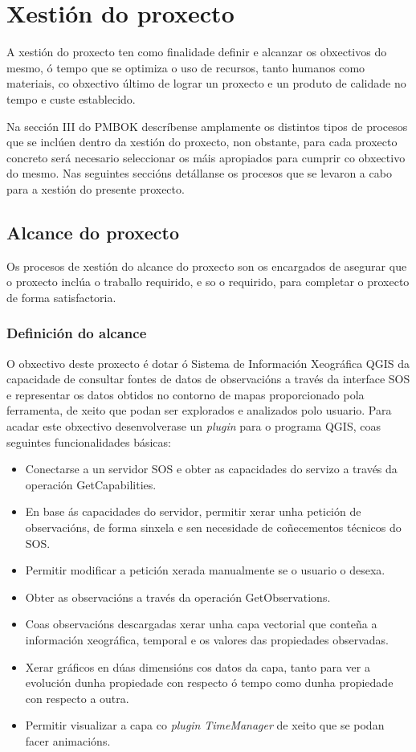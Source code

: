 \chapter{Xestión do proxecto}
A xestión do proxecto ten como finalidade definir e alcanzar os obxectivos do mesmo, ó tempo que se optimiza o uso de recursos, tanto humanos como materiais, co obxectivo último de lograr un proxecto e un produto de calidade no tempo e custe establecido.

Na sección III do PMBOK\cite{PMBOK} descríbense amplamente os distintos tipos de procesos que se inclúen dentro da xestión do proxecto, non obstante, para cada proxecto concreto será necesario seleccionar os máis apropiados para cumprir co obxectivo do mesmo. Nas seguintes seccións detállanse os procesos que se levaron a cabo para a xestión do presente proxecto.

\section{Alcance do proxecto}
Os procesos de xestión do alcance do proxecto son os encargados de asegurar que o proxecto inclúa o traballo requirido, e so o requirido, para completar o proxecto de forma satisfactoria.

\subsection{Definición do alcance}\label{subsec:DefAlcance}
O obxectivo deste proxecto é dotar ó Sistema de Información Xeográfica QGIS da capacidade de consultar fontes de datos de observacións a través da interface SOS e representar os datos obtidos no contorno de mapas proporcionado pola ferramenta, de xeito que podan ser explorados e analizados polo usuario. Para acadar este obxectivo desenvolverase un \emph{plugin} para o programa QGIS, coas seguintes funcionalidades básicas:

\begin{itemize}
\item Conectarse a un servidor SOS e obter as capacidades do servizo a través da operación GetCapabilities.
\item En base ás capacidades do servidor, permitir xerar unha petición de observacións, de forma sinxela e sen necesidade de coñecementos técnicos do SOS.
\item Permitir modificar a petición xerada manualmente se o usuario o desexa.
\item Obter as observacións a través da operación GetObservations.
\item Coas observacións descargadas xerar unha capa vectorial que conteña a información xeográfica, temporal e os valores das propiedades observadas.
\item Xerar gráficos en dúas dimensións cos datos da capa, tanto para ver a evolución dunha propiedade con respecto ó tempo como dunha propiedade con respecto a outra.
\item Permitir visualizar a capa co \emph{plugin} \emph{TimeManager} de xeito que se podan facer animacións.
\end{itemize}


